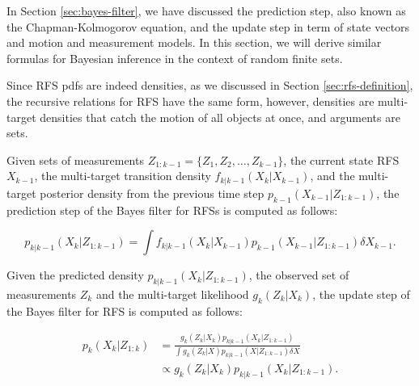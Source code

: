In Section \ref{sec:bayes-filter}, we have discussed the prediction step, also known as the Chapman-Kolmogorov equation, and the update step in term of state vectors and motion and measurement models. In this section, we will derive similar formulas for Bayesian inference in the context of random finite sets.

Since RFS pdfs are indeed densities, as we discussed in Section \ref{sec:rfs-definition}, the recursive relations for RFS have the same form, however, densities are multi-target densities that catch the motion of all objects at once, and arguments are sets.

\begin{theorem}\label{theorem:bayes-filter-predict-rfs}
    Given sets of measurements $Z_{1:k-1} = \{Z_1,\allowbreak Z_2, \ldots, Z_{k-1}\}$, the current state RFS $X_{k-1}$, the multi-target transition density $f_{k|k-1}(X_k | X_{k-1})$, and the multi-target posterior density from the previous time step $p_{k-1}\left({X}_{k-1} | {Z}_{1:k-1}\right)$, the prediction step of the Bayes filter for RFSs is computed as follows:

    \begin{equation}
        p_{k|k-1}\left({X}_k | {Z}_{1:k-1}\right)
        = \int
            f_{k|k-1}\left( {X}_k | {X}_{k-1} \right)
            p_{k-1}\left( {X}_{k-1} | {Z}_{1: k-1} \right)
            \delta {X}_{k-1}.
    \end{equation}
\end{theorem}

\begin{theorem}\label{theorem:bayes-filter-update-rfs}
    Given the predicted density $p_{k|k-1}\left({X}_k | {Z}_{1:k-1}\right)$, the observed set of measurements $Z_k$ and the multi-target likelihood $g_k(Z_k | X_k)$, the update step of the Bayes filter for RFS is computed as follows:
    
    \begin{align}
        p_{k}\left({X}_k | {Z}_{1: k}\right)
        &= \frac{
            g_k\left({Z}_k | {X}_k\right) p_{k|k-1}\left({X}_k | {Z}_{1: k-1}\right)
        }{
            \int g_k\left({Z}_k | X\right) p_{k|k-1}\left(X | {Z}_{1: k-1}\right) \delta X
        } \\
        &\propto g_k\left({Z}_k | {X}_k\right) p_{k|k-1}\left({X}_k | {Z}_{1: k-1}\right).
    \end{align}
\end{theorem}

